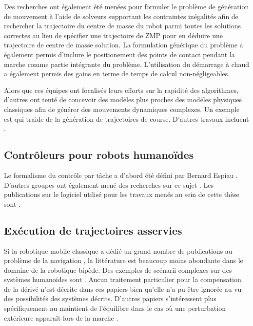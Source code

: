 Des recherches ont également été menées pour formuler le problème de
génération de mouvement à l'aide de solveurs supportant les
contraintes inégalités \cite{11icra.dimitrov,10ar.herdt} afin de
rechercher la trajectoire du centre de masse du robot parmi toutes les
solutions correctes au lieu de spécifier une trajectoire de ZMP pour
en déduire une trajectoire de centre de masse solution. La formulation
générique du problème a également permis d'inclure le positionement
des points de contact pendant la marche comme partie intégrante du
problème. L'utilisation du démarrage à chaud \cite{09icra.wieber} a
également permis des gains en terme de temps de calcul
non-négligeables.


Alors que ces équipes ont focalisés leurs efforts sur la rapidité des
algorithmes, d'autres ont tenté de concevoir des modèles plus proches
des modèles physiques classiques afin de générer des mouvements
dynamiques complexes. Un exemple est \cite{09robotica.mombaur} qui
traide de la génération de trajectoires de course. D'autres travaux
incluent \cite{07humanoids.suleiman,08kanehiro.rsj}.


\subsection{Contrôleurs pour robots humanoïdes}


Le formalisme du contrôle par tâche a d'abord été défini par Bernard
Espiau \cite{89iser.rives}. D'autres groupes ont également mené des
recherches sur ce sujet \cite{05icra.sentis}. Les publications sur le
logiciel utilisé pour les travaux menés au sein de cette thèse sont
\cite{09icar.mansard,1573536,10humanoids.kanoun}.

\subsection{Exécution de trajectoires asservies}

Si la robotique mobile classique a dédié un grand nombre de
publications au problème de la navigation
\cite{91icra.samson,1570831}, la littérature est beaucoup moins
abondante dans le domaine de la robotique bipède. Des exemples de
scénarii complexes sur des systèmes humanoïdes sont
\cite{05humanoids.michel,10springer.chestnut,06icra.MichelChestnut,5354575}. Aucun
traitement particulier pour la compensation de la dérivé n'est décrite
dans ces papiers bien qu'elle n'a pu être ignorée au vu des
possibilités des systèmes décrits. D'autres papiers s'intéressent plus
spécifiquement au maintient de l'équilibre dans le cas où une
perturbation extérieure apparaît lors de la marche
\cite{07icra.morisawa}.


